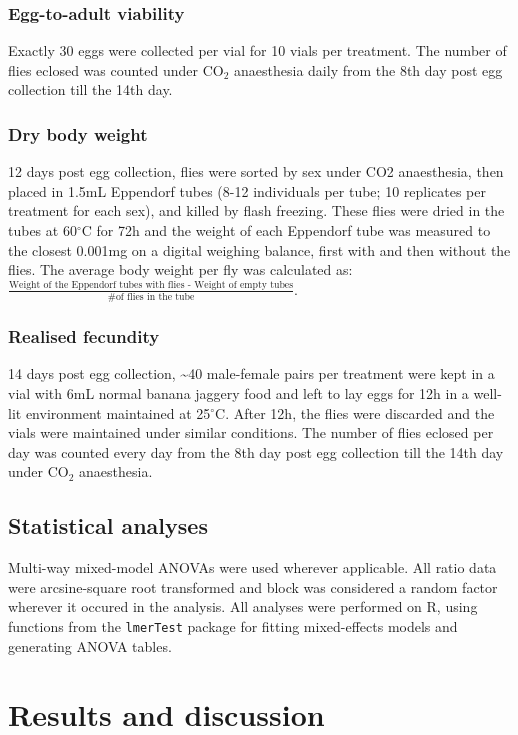 \documentclass[12pt,onecolumn,twoside]{article}
\begin{document}
	\subsubsection{Egg-to-adult viability}
	Exactly 30 eggs were collected per vial for 10 vials per treatment. The number of flies eclosed was counted under $\text{CO}_{2}$ anaesthesia daily from the 8th day post egg collection till the 14th day.
	\subsubsection{Dry body weight}
	12 days post egg collection, flies were sorted by sex under CO2 anaesthesia, then placed in 1.5mL Eppendorf tubes (8-12 individuals per tube; 10 replicates per treatment for each sex), and killed by flash freezing. These flies were dried in the tubes at 60$^{\circ}$C for 72h and the weight of each Eppendorf tube was measured to the closest 0.001mg on a digital weighing balance, first with and then without the flies. The average body weight per fly was calculated as: $\frac{\text{Weight of the Eppendorf tubes with flies - Weight of empty tubes}}{\text{\# of flies in the tube}}$.
	\subsubsection{Realised fecundity}
	14 days post egg collection, \textasciitilde 40 male-female pairs per treatment were kept in a vial with 6mL normal banana jaggery food and left to lay eggs for 12h in a well-lit environment maintained at 25$^{\circ}$C. After 12h, the flies were discarded and the vials were maintained under similar conditions. The number of flies eclosed per day was counted every day from the 8th day post egg collection till the 14th day under CO$_\text{2}$ anaesthesia.

	\subsection{Statistical analyses}
	Multi-way mixed-model ANOVAs were used wherever applicable. All ratio data were arcsine-square root transformed and block was considered a random factor wherever it occured in the analysis. All analyses were performed on R, using functions from the \texttt{lmerTest} package for fitting mixed-effects models and generating ANOVA tables.

	\section{Results and discussion}
\end{document}
